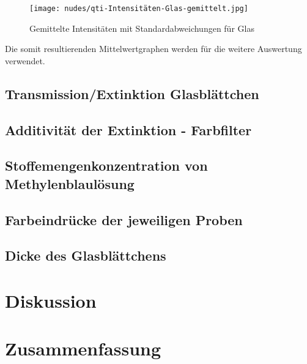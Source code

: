 \documentclass[12pt,a4paper,twoside]{article}
\begin{document}
\begin{figure}[H]
    \centering
    \texttt{[image: nudes/qti-Intensitäten-Glas-gemittelt.jpg]}
    \caption{Gemittelte Intensitäten mit Standardabweichungen für Glas}
    \label{fig:GemittelteGraphenIntensitätenGlas}
\end{figure}

\noindent
Die somit resultierenden Mittelwertgraphen werden für die weitere Auswertung verwendet.

\subsection{Transmission/Extinktion Glasblättchen}
\subsection{Additivität der Extinktion - Farbfilter}
\subsection{Stoffemengenkonzentration von Methylenblaulösung}
\subsection{Farbeindrücke der jeweiligen Proben}
\subsection{Dicke des Glasblättchens}









\section{Diskussion} %


\section{Zusammenfassung} %


\printbibliography[heading=bibintoc]
\end{document}
